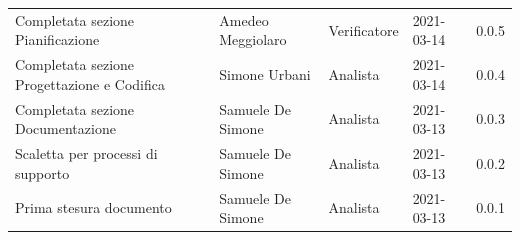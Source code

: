 \documentclass[a4paper]{article}
\begin{document}
\begin{center}
\begin{table}[h!]
\begin{tabular}{p{160px} p{86px} p{70px} p{60px} p{45px}}
            Completata sezione Pianificazione                                          & Amedeo Meggiolaro                           & Verificatore   & 2021-03-14    & 0.0.5             \\
            Completata sezione Progettazione e Codifica                                & Simone Urbani                               & Analista       & 2021-03-14    & 0.0.4             \\
            Completata sezione Documentazione                                          & Samuele De Simone                           & Analista       & 2021-03-13    & 0.0.3             \\
            Scaletta per processi di supporto                                          & Samuele De Simone                           & Analista       & 2021-03-13    & 0.0.2             \\
            Prima stesura documento                                                    & Samuele De Simone                           & Analista       & 2021-03-13    & 0.0.1             \\
        \end{tabular}
    \end{table}
\end{center}
\newpage
\tableofcontents
\newpage





\end{document}
